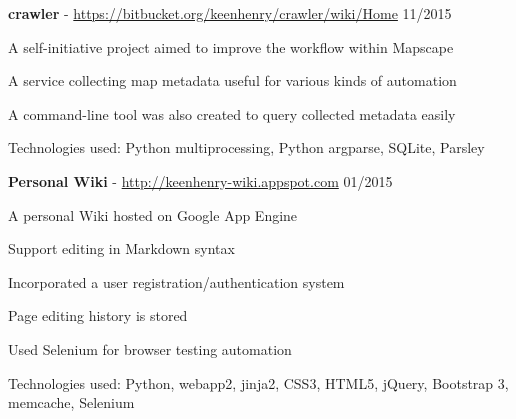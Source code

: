 \documentclass[margin,line]{resume}
\begin{document}
\begin{resume}
    \textbf{crawler} - \url{https://bitbucket.org/keenhenry/crawler/wiki/Home} \hfill 11/2015 \vspace{-3mm}\\\vspace{-1mm}%
      \begin{list2}
       \item A self-initiative project aimed to improve the workflow within Mapscape
       \item A service collecting map metadata useful for various kinds of automation
       \item A command-line tool was also created to query collected metadata easily
       \item Technologies used: Python multiprocessing, Python argparse, SQLite, Parsley
      \end{list2}

    \textbf{Personal Wiki} - \url{http://keenhenry-wiki.appspot.com} \hfill 01/2015 \vspace{-3mm}\\\vspace{-1mm}%
      \begin{list2}
       \item A personal Wiki hosted on Google App Engine
       \item Support editing in Markdown syntax
       \item Incorporated a user registration/authentication system
       \item Page editing history is stored
       \item Used Selenium for browser testing automation
       \item Technologies used: Python, webapp2, jinja2, CSS3, HTML5, jQuery, Bootstrap 3, memcache, Selenium
      \end{list2}



\end{resume}
\end{document}
